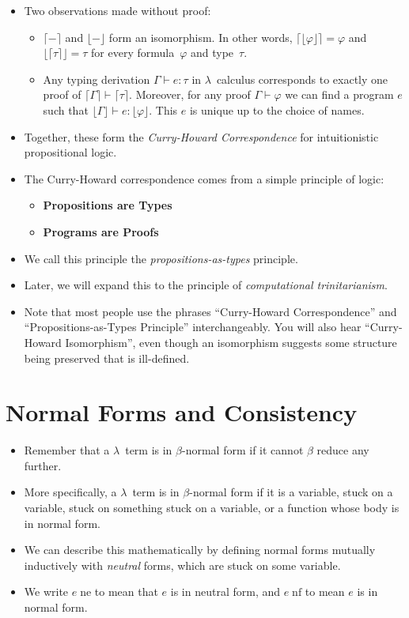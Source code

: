 \documentclass{lecturenotes}
\newcommand{\toform}[1]{\ensuremath{\lceil #1 \rceil}}
\newcommand{\totype}[1]{\ensuremath{\lfloor #1 \rfloor}}
\newcommand{\neutral}[1]{#1\;\text{ne}}
\newcommand{\nf}[1]{#1\;\text{nf}}
\begin{document}
\begin{itemize}
\item Two observations made without proof:
  \begin{itemize}
  \item $\toform{-}$ and $\totype{-}$ form an isomorphism.
    In other words, $\toform{\totype{\varphi}} = \varphi$ and $\totype{\toform{\tau}} = \tau$ for every formula~$\varphi$ and type~$\tau$.
  \item Any typing derivation $\Gamma \vdash e : \tau$ in $\lambda$~calculus corresponds to exactly one proof of $\toform{\Gamma} \vdash \toform{\tau}$.
    Moreover, for any proof $\Gamma\vdash \varphi$ we can find a program $e$ such that $\totype{\Gamma} \vdash e : \totype{\varphi}$.
    This $e$ is unique up to the choice of names.
  \end{itemize}
\item Together, these form the \emph{Curry-Howard Correspondence} for intuitionistic propositional logic.
\item The Curry-Howard correspondence comes from a simple principle of logic:
  \begin{itemize}
  \item \textbf{\large Propositions are Types}
  \item \textbf{\large Programs are Proofs}
  \end{itemize}
\item We call this principle the \emph{propositions-as-types} principle.
\item Later, we will expand this to the principle of \emph{computational trinitarianism}.
\item Note that most people use the phrases ``Curry-Howard Correspondence'' and ``Propositions-as-Types Principle'' interchangeably.
  You will also hear ``Curry-Howard Isomorphism'', even though an isomorphism suggests some structure being preserved that is ill-defined.
\end{itemize}

\section{Normal Forms and Consistency}
\label{sec:norm-forms-cons}

\begin{itemize}
\item Remember that a $\lambda$~term is in $\beta$-normal form if it cannot $\beta$ reduce any further.
\item More specifically, a $\lambda$~term is in $\beta$-normal form if it is a variable, stuck on a variable, stuck on something stuck on a variable, or a function whose body is in normal form.
\item We can describe this mathematically by defining normal forms mutually inductively with \emph{neutral} forms, which are stuck on some variable.
\item We write $\neutral{e}$ to mean that $e$ is in neutral form, and $\nf{e}$ to mean $e$ is in normal form.
\end{itemize}
\end{document}
